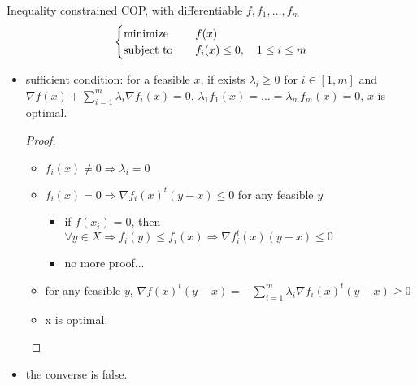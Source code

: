 \begin{remark}
    Inequality constrained COP, with differentiable $f, f_1, \dots, f_m$\[\begin{cases}
        \operatorname{minimize} \quad &f(x) \\
        \operatorname{subject\ to} \quad & f_i(x) \le 0, \quad 1 \le i \le m
    \end{cases}\]
    \begin{itemize}
        \item sufficient condition: for a feasible $x$, if exists  $\lambda_i \ge 0$ for $i \in [1, m]$ and $\nabla f(x)+\sum_{i=1}^{m} \lambda_{i} \nabla f_{i}(x)=0$, $\lambda_{1} f_{1}(x)=\ldots=\lambda_{m} f_{m}(x)=0$, $x$ is optimal.\begin{proof}\text{}
            \begin{itemize}
                \item $f_i(x) \neq 0 \Longrightarrow \lambda_i = 0$
                \item $f_i(x) = 0 \Longrightarrow \nabla f_i(x)^t(y - x) \le 0$ for any feasible $y$\begin{itemize}
                    \item if $f(x_i) = 0$, then $\forall y \in X \Longrightarrow f_i(y) \le f_i(x) \Longrightarrow \nabla f_i^t(x)(y - x) \le 0$
                    \item no more proof...
                \end{itemize}
                \item for any feasible $y$, $\nabla f(x)^t (y - x) = -\sum_{i = 1}^m \lambda_i \nabla f_i(x)^t(y - x) \ge 0$
                \item x is optimal.
            \end{itemize}
        \end{proof}
        \item the converse is false.
    \end{itemize}
\end{remark}


